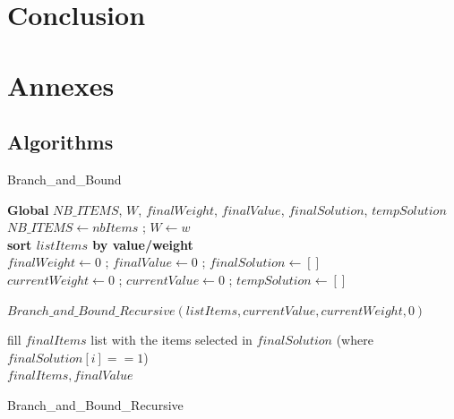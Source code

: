 \documentclass[a4paper, 11pt]{article}
\begin{document}
\begin{center}
\section{Conclusion}

\newpage

\appendix
\section{Annexes}

\listofalgocfs
\newpage

\subsection{Algorithms}
\begin{algorithm}[hbt!]
    \caption{Branch\_and\_Bound}\label{alg:two}
    
    \BlankLine
    \textbf{Global} $NB\_ITEMS$, $W$, $finalWeight$, $finalValue$, $finalSolution$, $tempSolution$\\
    
    \BlankLine
    $NB\_ITEMS \leftarrow nbItems$ ; 
    $W \leftarrow w$\\
    \textbf{sort $listItems$ by value/weight}\\
    $finalWeight \leftarrow 0$ ; 
    $finalValue \leftarrow 0$ ; 
    $finalSolution \leftarrow []$\\
    $currentWeight \leftarrow 0$ ; 
    $currentValue \leftarrow 0$ ; 
    $tempSolution \leftarrow []$\\
    
    \BlankLine
    $Branch\_and\_Bound\_Recursive(listItems,currentValue, currentWeight, 0)$
    
    \BlankLine
    fill $finalItems$ list with the items selected in $finalSolution$ (where $finalSolution[i] == 1$)\\
    \Return $finalItems, finalValue$
    
    
\end{algorithm}

\begin{algorithm}[hbt!]
    \caption{Branch\_and\_Bound\_Recursive}\label{alg:two}
    

\end{algorithm}
\end{center}
\end{document}
